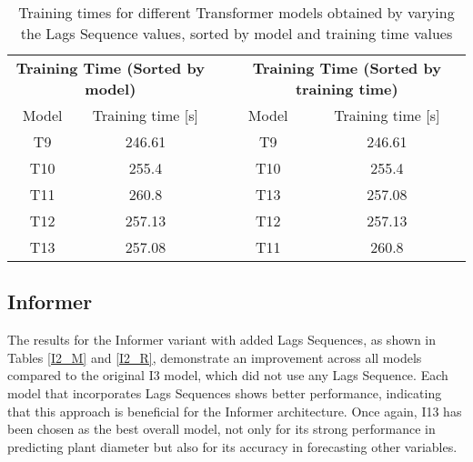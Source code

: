 \begin{table}[]
    \begin{tabular}{ccccc}
    \multicolumn{2}{c}{\cellcolor[HTML]{FFFFFF}\textbf{Training   Time (Sorted by model)}} &  & \multicolumn{2}{c}{\cellcolor[HTML]{FFFFFF}\textbf{Training Time (Sorted   by training time)}} \\
    Model                         & Training time {[}s{]}                                  &  & Model                             & Training time {[}s{]}                                      \\
    T9                            & \cellcolor[HTML]{63BE7B}246.61                         &  & T9                                & \cellcolor[HTML]{63BE7B}246.61                             \\
    T10                           & \cellcolor[HTML]{E5E382}255.4                          &  & T10                               & \cellcolor[HTML]{E5E382}255.4                              \\
    T11                           & \cellcolor[HTML]{F8696B}260.8                          &  & T13                               & \cellcolor[HTML]{FFEB84}257.08                             \\
    T12                           & \cellcolor[HTML]{FFEA84}257.13                         &  & T12                               & \cellcolor[HTML]{FFEA84}257.13                             \\
    T13                           & \cellcolor[HTML]{FFEB84}257.08                         &  & T11                               & \cellcolor[HTML]{F8696B}260.8                             
    \end{tabular}%
    \caption{Training times for different Transformer models obtained  by varying the Lags Sequence values, sorted by model and training time values}
    \label{T2_T}
    \end{table}


\subsection{Informer}
The results for the Informer variant with added Lags Sequences, as shown in Tables \ref{I2_M} and \ref{I2_R}, demonstrate an improvement across all models compared to the original I3 model, which did not use any Lags Sequence. Each model that incorporates Lags Sequences shows better performance, indicating that this approach is beneficial for the Informer architecture. Once again, I13 has been chosen as the best overall model, not only for its strong performance in predicting plant diameter but also for its accuracy in forecasting other variables.

